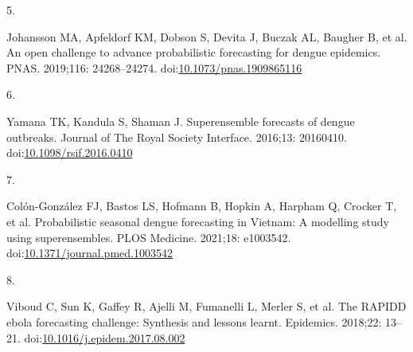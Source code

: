 \documentclass[10pt,letterpaper]{article} %
\newlength{\cslhangindent}
\newlength{\csllabelwidth}
\newlength{\cslentryspacingunit} %
\newenvironment{CSLReferences}[2] %
 {%
  \setlength{\parindent}{0pt}
  \ifodd #1
  \let\oldpar\par
  \def\par{\hangindent=\cslhangindent\oldpar}
  \fi
  \setlength{\parskip}{#2\cslentryspacingunit}
 }%
 {}
\newcommand{\CSLLeftMargin}[1]{\parbox[t]{\csllabelwidth}{#1}}
\newcommand{\CSLRightInline}[1]{\parbox[t]{\linewidth - \csllabelwidth}{#1}\break}
\providecommand{\DIFaddbegin}{} %
\providecommand{\DIFaddend}{} %
\providecommand{\DIFdelbegin}{} %
\providecommand{\DIFdelend}{} %
\newcommand{\DIFscaledelfig}{0.5}
\newlength{\DIFdelgraphicswidth} %
\newlength{\DIFdelgraphicsheight} %
\newcommand{\DIFaddincludegraphics}[2][]{{\color{blue}\fbox{\DIFOincludegraphics[#1]{#2}}}} %
\newcommand{\DIFdelincludegraphics}[2][]{%
\sbox{\DIFdelgraphicsbox}{\DIFOincludegraphics[#1]{#2}}%
\settoboxwidth{\DIFdelgraphicswidth}{\DIFdelgraphicsbox} %
\settoboxtotalheight{\DIFdelgraphicsheight}{\DIFdelgraphicsbox} %
\scalebox{\DIFscaledelfig}{%
\parbox[b]{\DIFdelgraphicswidth}{\usebox{\DIFdelgraphicsbox}\\[-\baselineskip] \rule{\DIFdelgraphicswidth}{0em}}\llap{\resizebox{\DIFdelgraphicswidth}{\DIFdelgraphicsheight}{%
\setlength{\unitlength}{\DIFdelgraphicswidth}%
\begin{picture}(1,1)%
\thicklines\linethickness{2pt} %
{\color[rgb]{1,0,0}\put(0,0){\framebox(1,1){}}}%
{\color[rgb]{1,0,0}\put(0,0){\line( 1,1){1}}}%
{\color[rgb]{1,0,0}\put(0,1){\line(1,-1){1}}}%
\end{picture}%
}\hspace*{3pt}}} %
} %
\DeclareRobustCommand{\DIFaddbegin}{\DIFOaddbegin \let\includegraphics\DIFaddincludegraphics} %
\DeclareRobustCommand{\DIFaddend}{\DIFOaddend \let\includegraphics\DIFOincludegraphics} %
\DeclareRobustCommand{\DIFdelbegin}{\DIFOdelbegin \let\includegraphics\DIFdelincludegraphics} %
\DeclareRobustCommand{\DIFdelend}{\DIFOaddend \let\includegraphics\DIFOincludegraphics} %
\begin{document}
\begin{CSLReferences}{0}{0}
\leavevmode{}%
\CSLLeftMargin{5. }
\DIFdelbegin %
\DIFdelend \DIFaddbegin \CSLRightInline{Johansson MA, Apfeldorf KM, Dobson S, Devita J, Buczak
AL, Baugher B, et al. An open challenge to advance probabilistic
forecasting for dengue epidemics. PNAS. 2019;116: 24268--24274.
doi:\href{https://doi.org/10.1073/pnas.1909865116}{10.1073/pnas.1909865116}}
\DIFaddend 

\leavevmode{}%
\CSLLeftMargin{6. }
\DIFdelbegin %
\DIFdelend \DIFaddbegin \CSLRightInline{Yamana TK, Kandula S, Shaman J. Superensemble forecasts
of dengue outbreaks. Journal of The Royal Society Interface. 2016;13:
20160410.
doi:\href{https://doi.org/10.1098/rsif.2016.0410}{10.1098/rsif.2016.0410}}
\DIFaddend 

\leavevmode{}%
\CSLLeftMargin{7. }
\DIFdelbegin %
\DIFdelend \DIFaddbegin \CSLRightInline{Colón-González FJ, Bastos LS, Hofmann B, Hopkin A,
Harpham Q, Crocker T, et al. Probabilistic seasonal dengue forecasting
in {Vietnam}: {A} modelling study using superensembles. PLOS Medicine.
2021;18: e1003542.
doi:\href{https://doi.org/10.1371/journal.pmed.1003542}{10.1371/journal.pmed.1003542}}
\DIFaddend 

\leavevmode{}%
\CSLLeftMargin{8. }
\DIFdelbegin %
\DIFdelend \DIFaddbegin \CSLRightInline{Viboud C, Sun K, Gaffey R, Ajelli M, Fumanelli L, Merler
S, et al. The {RAPIDD} ebola forecasting challenge: {Synthesis} and
lessons learnt. Epidemics. 2018;22: 13--21.
doi:\href{https://doi.org/10.1016/j.epidem.2017.08.002}{10.1016/j.epidem.2017.08.002}}
\DIFaddend 


\end{CSLReferences}
\end{document}
